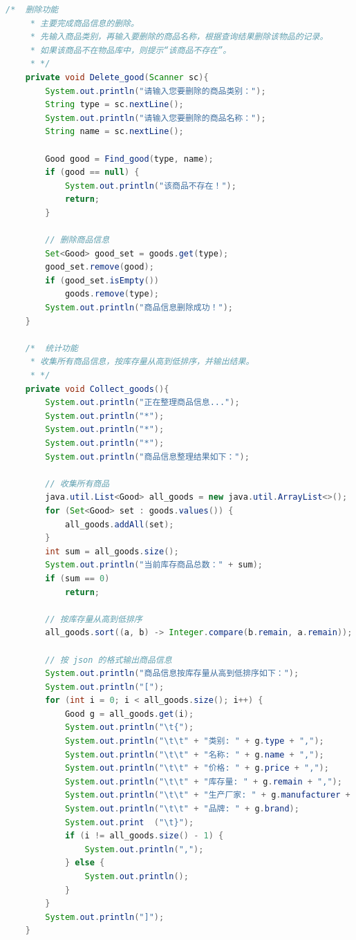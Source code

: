 \documentclass[12pt, a4paper, oneside]{ctexart}
\begin{document}
\begin{lstlisting}[language=Java, breaklines=true]
    /*  删除功能
     * 主要完成商品信息的删除。
     * 先输入商品类别，再输入要删除的商品名称，根据查询结果删除该物品的记录。
     * 如果该商品不在物品库中，则提示“该商品不存在”。
     * */
    private void Delete_good(Scanner sc){
        System.out.println("请输入您要删除的商品类别：");
        String type = sc.nextLine();
        System.out.println("请输入您要删除的商品名称：");
        String name = sc.nextLine();

        Good good = Find_good(type, name);
        if (good == null) {
            System.out.println("该商品不存在！");
            return;
        }

        // 删除商品信息
        Set<Good> good_set = goods.get(type);
        good_set.remove(good);
        if (good_set.isEmpty())
            goods.remove(type);
        System.out.println("商品信息删除成功！");
    }

    /*  统计功能
     * 收集所有商品信息，按库存量从高到低排序，并输出结果。
     * */
    private void Collect_goods(){
        System.out.println("正在整理商品信息...");
        System.out.println("*");
        System.out.println("*");
        System.out.println("*");
        System.out.println("商品信息整理结果如下：");

        // 收集所有商品
        java.util.List<Good> all_goods = new java.util.ArrayList<>();
        for (Set<Good> set : goods.values()) {
            all_goods.addAll(set);
        }
        int sum = all_goods.size();
        System.out.println("当前库存商品总数：" + sum);
        if (sum == 0)
            return;

        // 按库存量从高到低排序
        all_goods.sort((a, b) -> Integer.compare(b.remain, a.remain));

        // 按 json 的格式输出商品信息
        System.out.println("商品信息按库存量从高到低排序如下：");
        System.out.println("[");
        for (int i = 0; i < all_goods.size(); i++) {
            Good g = all_goods.get(i);
            System.out.println("\t{");
            System.out.println("\t\t" + "类别: " + g.type + ",");
            System.out.println("\t\t" + "名称: " + g.name + ",");
            System.out.println("\t\t" + "价格: " + g.price + ",");
            System.out.println("\t\t" + "库存量: " + g.remain + ",");
            System.out.println("\t\t" + "生产厂家: " + g.manufacturer + ",");
            System.out.println("\t\t" + "品牌: " + g.brand);
            System.out.print  ("\t}");
            if (i != all_goods.size() - 1) {
                System.out.println(",");
            } else {
                System.out.println();
            }
        }
        System.out.println("]");
    }


\end{lstlisting}
\end{document}
